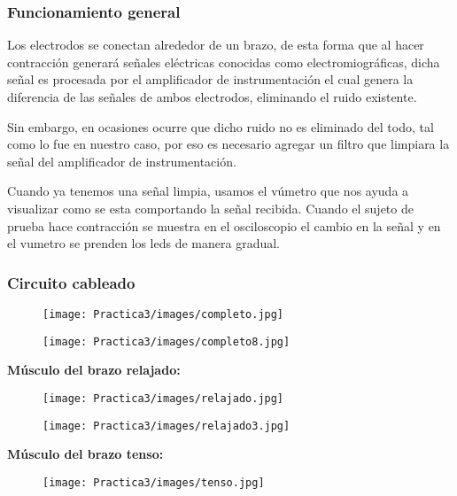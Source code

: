 \documentclass[12pt]{article}
\begin{document}
    \subsubsection{Funcionamiento general}
    Los electrodos se conectan alrededor de un brazo,  de esta forma que al hacer contracción generará señales eléctricas conocidas como electromiográficas, dicha señal es procesada por el amplificador de instrumentación el cual genera la diferencia de las señales de ambos electrodos, eliminando el ruido existente.
    
    Sin embargo, en ocasiones ocurre que dicho ruido no es eliminado del todo, tal como lo fue en nuestro caso, por eso es necesario agregar un filtro que limpiara la señal del amplificador de instrumentación.
    
    Cuando ya tenemos una señal limpia, usamos el vúmetro que nos ayuda a visualizar como se esta comportando la señal recibida. Cuando el sujeto de prueba hace contracción se muestra en el osciloscopio el cambio en la señal y en el vumetro se prenden los leds de manera gradual.

    
    \newpage
	\subsubsection{Circuito cableado}
		\begin{figure}[h!]
                \centering
                \texttt{[image: Practica3/images/completo.jpg]}
    \end{figure} 
    
    \begin{figure}[h!]
                \centering
                \texttt{[image: Practica3/images/completo8.jpg]}
    \end{figure} 
    
        \newpage
    \textbf{Músculo del brazo relajado:}
    \begin{figure}[h!]
                \centering
                \texttt{[image: Practica3/images/relajado.jpg]}
    \end{figure} 
    
    \begin{figure}[h!]
                \centering
                \texttt{[image: Practica3/images/relajado3.jpg]}
    \end{figure} 
    \newpage
        \textbf{Músculo del brazo tenso:}
    \begin{figure}[h!]
                \centering
                \texttt{[image: Practica3/images/tenso.jpg]}
    \end{figure} 
    
\end{document}
